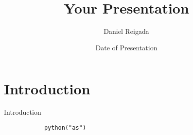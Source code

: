 \documentclass[14pt]{beamer}
\title[Your Short Title]{Your Presentation}
\author{Daniel Reigada}
\institute{IST}
\date{Date of Presentation}
\begin{document}
  \begin{frame}
    \titlepage
  \end{frame}

  \section{Introduction}

  \begin{frame}[fragile]{Introduction}
    \begin{figure}
    \begin{verbatim}
      python("as")
    \end{verbatim}
    \end{figure}
  \end{frame}

  
\end{document}
